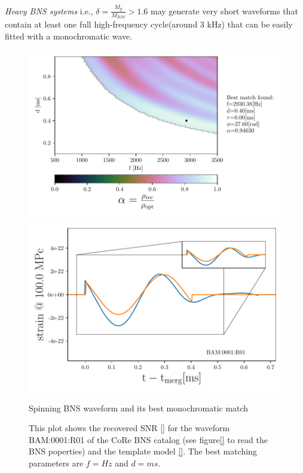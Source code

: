 \FloatBarrier



\textit{Heavy BNS systems} i.e., $\delta=\frac{M_g}{M_{TOV}}>1.6$ may generate very short waveforms that contain at least one full high-frequency cycle(around 3 kHz) that can be easily fitted with a monochromatic wave.

\begin{figure}[!htbp]
\begin{center}
\begin{minipage}[t]{0.5\linewidth}
\vspace{0pt}
\includegraphics[scale=0.6,trim={2mm 0 35mm 0},clip]{images/Data_analysis/results/2D_grid_7.pdf}
\end{minipage}%
\begin{minipage}[t]{0.5\linewidth}
\vspace{20pt}
\includegraphics[scale=0.45]{images/Data_analysis/results/2D_grid_8.pdf}
\end{minipage}
\captionsetup{width=0.8\textwidth}
\caption{Spinning BNS waveform and its best monochromatic match}
\caption*{This plot shows the recovered SNR \ref{} for the waveform BAM:0001:R01 of the CoRe BNS catalog \cite{}(see figure\ref{} to read the BNS poperties) and the template model \ref{}. The best matching parameters are $f=Hz$ and $d=ms$.}
\end{center}
\end{figure}

